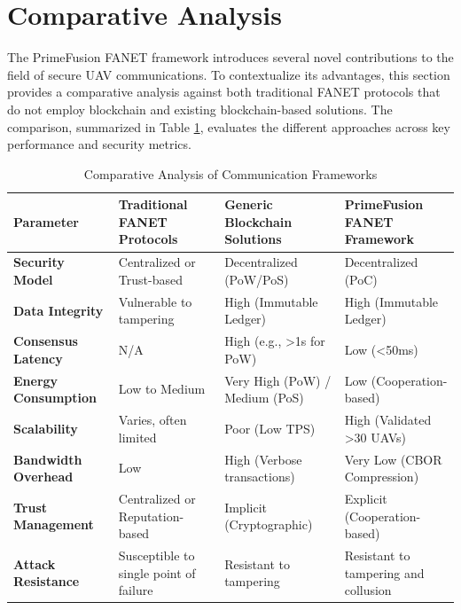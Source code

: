 \section{Comparative Analysis}
\label{sec:comparative_analysis}

The PrimeFusion FANET framework introduces several novel contributions to the field of secure UAV communications. To contextualize its advantages, this section provides a comparative analysis against both traditional FANET protocols that do not employ blockchain and existing blockchain-based solutions. The comparison, summarized in Table \ref{tab:comparison}, evaluates the different approaches across key performance and security metrics.

\begin{table}[!t]
\centering
\caption{Comparative Analysis of Communication Frameworks}
\label{tab:comparison}
\begin{tabular}{@{}llll@{}}
\toprule
\textbf{Parameter} & \textbf{Traditional FANET Protocols} & \textbf{Generic Blockchain Solutions} & \textbf{PrimeFusion FANET Framework} \\ \midrule
\textbf{Security Model} & Centralized or Trust-based & Decentralized (PoW/PoS) & Decentralized (PoC) \\
\textbf{Data Integrity} & Vulnerable to tampering & High (Immutable Ledger) & High (Immutable Ledger) \\
\textbf{Consensus Latency} & N/A & High (e.g., >1s for PoW) & Low (<50ms) \\
\textbf{Energy Consumption} & Low to Medium & Very High (PoW) / Medium (PoS) & Low (Cooperation-based) \\
\textbf{Scalability} & Varies, often limited & Poor (Low TPS) & High (Validated >30 UAVs) \\
\textbf{Bandwidth Overhead} & Low & High (Verbose transactions) & Very Low (CBOR Compression) \\
\textbf{Trust Management} & Centralized or Reputation-based & Implicit (Cryptographic) & Explicit (Cooperation-based) \\
\textbf{Attack Resistance} & Susceptible to single point of failure & Resistant to tampering & Resistant to tampering and collusion \\ \bottomrule
\end{tabular}
\end{table}

